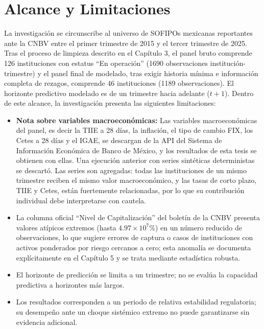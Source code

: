 \section{Alcance y Limitaciones}
\label{sec:limitaciones}
La investigación se circunscribe al universo de SOFIPOs mexicanas reportantes ante la CNBV entre el primer trimestre de 2015 y el tercer trimestre de 2025. Tras el proceso de limpieza descrito en el Capítulo 3, el panel bruto comprende 126 instituciones con estatus ``En operación'' (1690 observaciones institución-trimestre) y el panel final de modelado, tras exigir historia mínima e información completa de rezagos, comprende 46 instituciones (1189 observaciones). El horizonte predictivo modelado es de un trimestre hacia adelante ($t+1$). Dentro de este alcance, la investigación presenta las siguientes limitaciones:
\begin{itemize}
    \item \textbf{Nota sobre variables macroeconómicas:} Las variables macroeconómicas del panel, es decir la TIIE a 28 días, la inflación, el tipo de cambio FIX, los Cetes a 28 días y el IGAE, se descargan de la API del Sistema de Información Económica de Banco de México, y los resultados de esta tesis se obtienen con ellas. Una ejecución anterior con series sintéticas deterministas se descartó. Las series son agregadas: todas las instituciones de un mismo trimestre reciben el mismo valor macroeconómico, y las tasas de corto plazo, TIIE y Cetes, están fuertemente relacionadas, por lo que su contribución individual debe interpretarse con cautela.
    \item La columna oficial ``Nivel de Capitalización'' del boletín de la CNBV presenta valores atípicos extremos (hasta $4.97\times10^{7}\%$) en un número reducido de observaciones, lo que sugiere errores de captura o casos de instituciones con activos ponderados por riesgo cercanos a cero; esta anomalía se documenta explícitamente en el Capítulo 5 y se trata mediante estadística robusta.
    \item El horizonte de predicción se limita a un trimestre; no se evalúa la capacidad predictiva a horizontes más largos.
    \item Los resultados corresponden a un periodo de relativa estabilidad regulatoria; su desempeño ante un choque sistémico extremo no puede garantizarse sin evidencia adicional.
\end{itemize}

